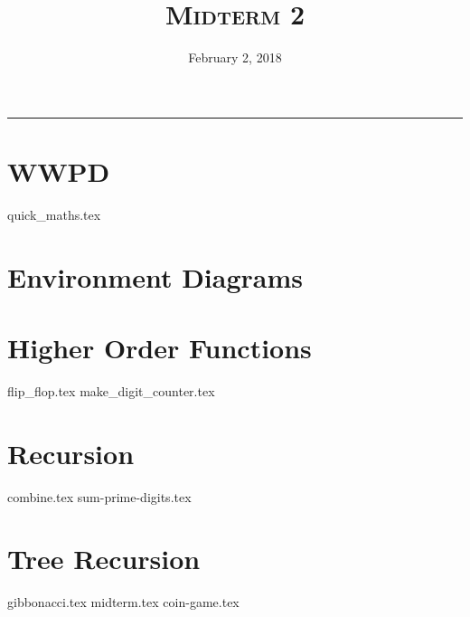 \documentclass{exam}
\title{\textsc{Midterm 2}}
\date{February 2, 2018}
\begin{document}
\maketitle
\rule{\textwidth}{0.15em}
\fontsize{12}{15}\selectfont



\section{WWPD}
\begin{questions}
{quick_maths.tex}
\end{questions}

\section{Environment Diagrams}

\section{Higher Order Functions}
\begin{questions}
{flip_flop.tex}
{make_digit_counter.tex}
\end{questions}

\section{Recursion}
\begin{questions}
{combine.tex}
{sum-prime-digits.tex}
\end{questions}

\section{Tree Recursion}
\begin{questions}
{gibbonacci.tex}
{midterm.tex}
{coin-game.tex}
\end{questions}
\end{document}
